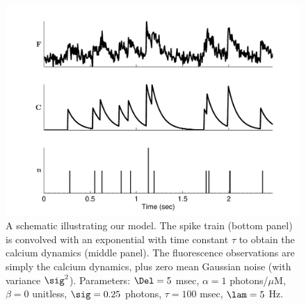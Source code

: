 \begin{figure}[H]
\centering \includegraphics[width=.9\linewidth]{../figs/schem}
\caption{A schematic illustrating our model. The spike train (bottom panel) is convolved with an exponential with time constant $\tau$ to obtain the calcium dynamics (middle panel).  The fluorescence observations are simply the calcium dynamics, plus zero mean Gaussian noise (with variance $\sig^2$). Parameters: $\Del=5$ msec, $\alpha=1$ photons/$\mu$M, $\beta=0$ unitless, $\sig=0.25$ photons, $\tau=100$ msec, $\lam=5$ Hz.} \label{fig:schem}
\end{figure}








